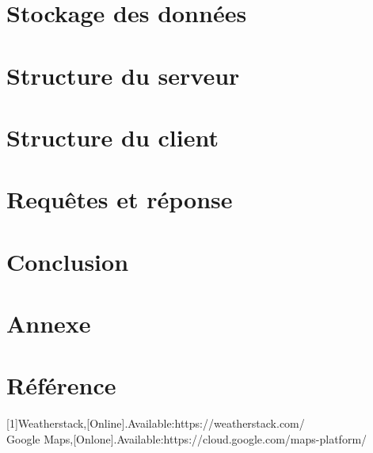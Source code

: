 \documentclass[14px]{article}
\begin{document}
\section{Stockage des données}

\section{Structure du serveur}

\section{Structure du client}

\section{Requêtes et réponse}

\section{Conclusion}

\section{Annexe}
\begin{figure1}
\end{figure1}
\section{Référence}
[1]Weatherstack,[Online].Available:https://weatherstack.com/\\
[2]Google Maps,[Onlone].Available:https://cloud.google.com/maps-platform/\\
\end{document}
